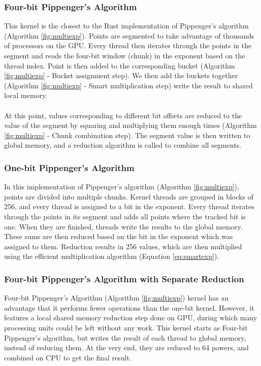 \FloatBarrier
\subsubsection{Four-bit Pippenger's Algorithm}
This kernel is the closest to the Rust implementation of Pippenger's algorithm (Algorithm \ref{fig:multiexp}). Points are segmented to take advantage of thousands of processors on the GPU. Every thread then iterates through the points in the segment and reads the four-bit window (chunk) in the exponent based on the thread index. Point is then added to the corresponding bucket (Algorithm \ref{fig:multiexp} - Bucket assignment step). We then add the buckets together (Algorithm \ref{fig:multiexp} - Smart multiplication step) write the result to shared local memory.\\
\\
At this point, values corresponding to different bit offsets are reduced to the value of the segment by squaring and multiplying them enough times (Algorithm \ref{fig:multiexp} - Chunk combination step). The segment value is then written to global memory, and a reduction algorithm is called to combine all segments.
\subsubsection{One-bit Pippenger's Algorithm}
In this implementation of Pippenger's algorithm (Algorithm \ref{fig:multiexp}), points are divided into multiple chunks. Kernel threads are grouped in blocks of 256, and every thread is assigned to a bit in the exponent. Every thread iterates through the points in its segment and adds all points where the tracked bit is one. When they are finished, threads write the results to the global memory. These sums are then reduced based on the bit in the exponent which was assigned to them. Reduction results in 256 values, which are then multiplied using the efficient multiplication algorithm (Equation \ref{eq:smartexp}).
\subsubsection{Four-bit Pippenger's Algorithm with Separate Reduction}
Four-bit Pippenger's Algorithm (Algorithm \ref{fig:multiexp}) kernel has an advantage that it performs fewer operations than the one-bit kernel. However, it features a local shared memory reduction step done on GPU, during which many processing units could be left without any work. This kernel starts as Four-bit Pippenger's algorithm, but writes the result of each thread to global memory, instead of reducing them. At the very end, they are reduced to 64 powers, and combined on CPU to get the final result.
